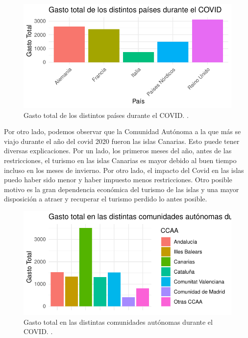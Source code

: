 \documentclass[data,article,submit,moreauthors,pdftex]{Definitions/mdpi}
\begin{document}
\begin{figure}[H]
\includegraphics{ProyectoAED2024_Rmd_files/figure-latex/gasto paises covid-1} \caption{Gasto total de los distintos países durante el COVID. .\label{fig:gastototalporpaisescovid}}\label{fig:gasto paises covid}
\end{figure}

Por otro lado, podemos observar que la Comunidad Autónoma a la que más
se viajo durante el año del covid 2020 fueron las islas Canarias. Esto
puede tener diversas explicaciones. Por un lado, los primeros meses del
año, antes de las restricciones, el turismo en las islas Canarias es
mayor debido al buen tiempo incluso en los meses de invierno. Por otro
lado, el impacto del Covid en las islas puedo haber sido menor y haber
impuesto menos restricciones. Otro posible motivo es la gran dependencia
económica del turismo de las islas y una mayor disposición a atraer y
recuperar el turismo perdido lo antes posible.

\begin{figure}[H]
\includegraphics{ProyectoAED2024_Rmd_files/figure-latex/gasto comunidades covid-1} \caption{Gasto total en las distintas comunidades autónomas durante el COVID. .\label{fig:gastototalporCCAAcovid}}\label{fig:gasto comunidades covid}
\end{figure}
\end{document}
